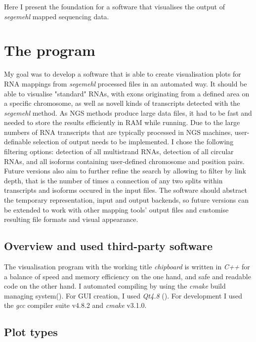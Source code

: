 \documentclass[11pt]{article}
\begin{document}
Here I present the foundation for a software that visualises the output of \emph{segemehl} mapped
sequencing data.


\section{The program}
\label{sec-2}

My goal was to develop a software that is able to create visualisation plots for RNA mappings 
from \emph{segemehl} processed files in an automated way.
It should be able to visualise "standard" RNAs, with exons originating from a defined area on a 
specific chromosome, as well as novell kinds of transcripts detected with the \emph{segemehl} method. 
As NGS methods produce large data files, it had to be fast and needed to store the results 
efficiently in RAM while running. 
Due to the large numbers of RNA transcripts that are typically processed in NGS machines,
user-definable selection of output needs to be implemented.
I chose the following filtering options:
detection of all multistrand RNAs,
detection of all circular RNAs,
and all isoforms containing user-defined chromosome and position pairs.
Future versions also aim to further refine the search by allowing to filter by link depth, that
is the number of times a connection of any two splits within transcripts and isoforms occured in 
the input files.
The software should abstract the temporary representation, input and output backends, so future 
versions can be extended to work with other mapping tools' output files and customise resulting 
file formats and visual appearance.


\subsection{Overview and used third-party software}
\label{sec-2-1}

The visualisation program with the working title \emph{chipboard} is written in \emph{C++} for a balance
of speed and memory efficiency on the one hand, and safe and readable code on the other hand.
I automated compiling by using the \emph{cmake} build managing system(\cite{cmake}). For GUI creation,
I used \emph{Qt4.8} (\cite{qtpage}).
For development I used the \emph{gcc} compiler suite v4.8.2 and \emph{cmake} v3.1.0.


\subsection{Plot types}
\label{sec-2-2}
\end{document}
